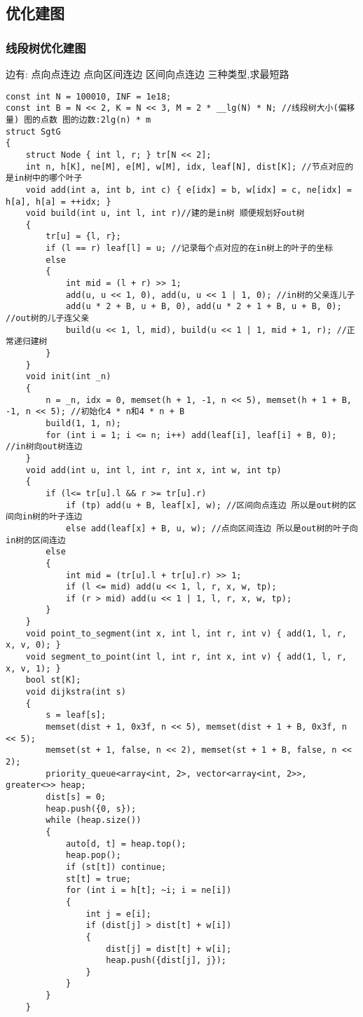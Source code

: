 \documentclass[a4paper, fontset=none]{ctexart}
\begin{document}
\subsection{优化建图}
\subsubsection{线段树优化建图}

边有: \quad 点向点连边 \quad 点向区间连边 \quad 区间向点连边 \quad 三种类型,求最短路


\begin{verbatim}
const int N = 100010, INF = 1e18;
const int B = N << 2, K = N << 3, M = 2 * __lg(N) * N; //线段树大小(偏移量) 图的点数 图的边数:2lg(n) * m
struct SgtG
{
    struct Node { int l, r; } tr[N << 2];
    int n, h[K], ne[M], e[M], w[M], idx, leaf[N], dist[K]; //节点对应的是in树中的哪个叶子
    void add(int a, int b, int c) { e[idx] = b, w[idx] = c, ne[idx] = h[a], h[a] = ++idx; }
    void build(int u, int l, int r)//建的是in树 顺便规划好out树
    {
        tr[u] = {l, r};
        if (l == r) leaf[l] = u; //记录每个点对应的在in树上的叶子的坐标
        else
        {
            int mid = (l + r) >> 1;
            add(u, u << 1, 0), add(u, u << 1 | 1, 0); //in树的父亲连儿子
            add(u * 2 + B, u + B, 0), add(u * 2 + 1 + B, u + B, 0); //out树的儿子连父亲
            build(u << 1, l, mid), build(u << 1 | 1, mid + 1, r); //正常递归建树
        }
    }
    void init(int _n)
    {
        n = _n, idx = 0, memset(h + 1, -1, n << 5), memset(h + 1 + B, -1, n << 5); //初始化4 * n和4 * n + B
        build(1, 1, n);
        for (int i = 1; i <= n; i++) add(leaf[i], leaf[i] + B, 0); //in树向out树连边
    }
    void add(int u, int l, int r, int x, int w, int tp)
    {
        if (l<= tr[u].l && r >= tr[u].r)
            if (tp) add(u + B, leaf[x], w); //区间向点连边 所以是out树的区间向in树的叶子连边
            else add(leaf[x] + B, u, w); //点向区间连边 所以是out树的叶子向in树的区间连边
        else
        {
            int mid = (tr[u].l + tr[u].r) >> 1;
            if (l <= mid) add(u << 1, l, r, x, w, tp);
            if (r > mid) add(u << 1 | 1, l, r, x, w, tp);
        }
    }
    void point_to_segment(int x, int l, int r, int v) { add(1, l, r, x, v, 0); }
    void segment_to_point(int l, int r, int x, int v) { add(1, l, r, x, v, 1); }
    bool st[K];
    void dijkstra(int s)
    {
        s = leaf[s];
        memset(dist + 1, 0x3f, n << 5), memset(dist + 1 + B, 0x3f, n << 5);
        memset(st + 1, false, n << 2), memset(st + 1 + B, false, n << 2);
        priority_queue<array<int, 2>, vector<array<int, 2>>, greater<>> heap;
        dist[s] = 0;
        heap.push({0, s});
        while (heap.size())
        {
            auto[d, t] = heap.top();
            heap.pop();
            if (st[t]) continue;
            st[t] = true;
            for (int i = h[t]; ~i; i = ne[i])
            {
                int j = e[i];
                if (dist[j] > dist[t] + w[i])
                {
                    dist[j] = dist[t] + w[i];
                    heap.push({dist[j], j});
                }
            }
        }
    }


\end{verbatim}
\end{document}

